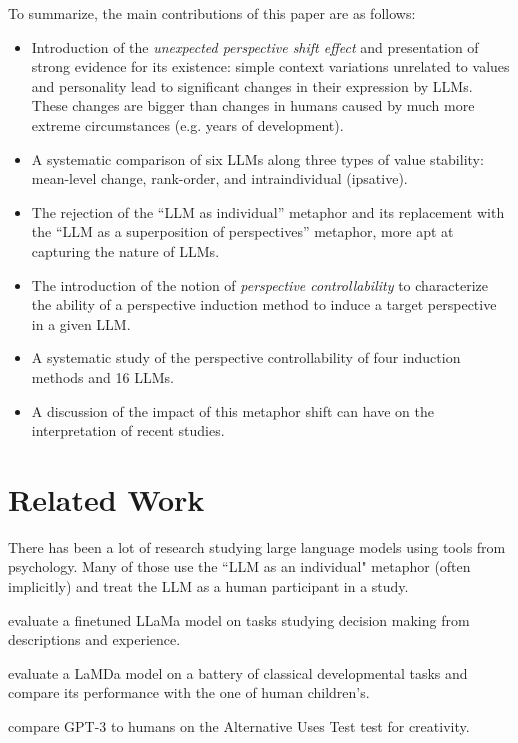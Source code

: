 To summarize, the main contributions of this paper are as follows:

\begin{itemize}[topsep=0pt,parsep=1pt,partopsep=1pt,leftmargin=*]

    \item Introduction of the \textit{unexpected perspective shift effect} and presentation of strong evidence for its existence: simple context variations unrelated to values and personality lead to significant changes in their expression by LLMs. These changes are bigger than changes in humans caused by much more extreme circumstances (e.g. years of development).
    \item A systematic comparison of six LLMs along three types of value stability: mean-level change, rank-order, and intraindividual (ipsative). 
    \item The rejection of the ``LLM as individual'' metaphor and its replacement with the ``LLM as a superposition of perspectives'' metaphor, more apt at capturing the nature of LLMs.
    \item The introduction of the notion of \textit{perspective controllability} to characterize the ability of a perspective induction method to induce a target perspective in a given LLM.
    \item A systematic study of the perspective controllability of four induction methods and 16 LLMs.
    \item A discussion of the impact of this metaphor shift can have on the interpretation of recent studies. 
\end{itemize}

\section{Related Work}

There has been a lot of research studying large language models using tools from psychology. Many of those use the ``LLM as an individual" metaphor (often implicitly) and treat the LLM as a human participant in a study.

\citet{binz2023turning} evaluate a finetuned LLaMa model on tasks studying decision making from descriptions and experience.

\citet{kosoy2023comparing} evaluate a LaMDa model on a battery of classical developmental tasks and compare its performance with the one of human children's.

\citet{stevenson2022putting} compare GPT-3 to humans on the Alternative Uses Test \citep{aut} test for creativity.


